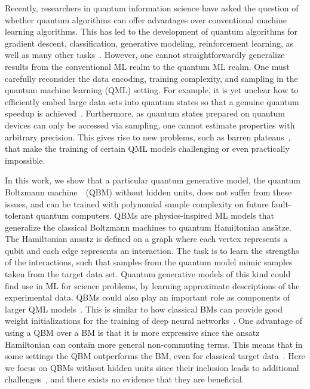 \documentclass[
    aps,
    prx,
    onecolumn
]{revtex4-2}
\begin{document}
Recently, researchers in quantum information science have asked the question of whether quantum algorithms can offer advantages over conventional machine learning algorithms. This has led to the development of quantum algorithms for gradient descent, classification, generative modeling, reinforcement learning, as well as many other tasks~\cite{Dunjko_2018, Ciliberto_2018, Benedetti_2019, Lamata_2020, Cerezo_2022}. However, one cannot straightforwardly generalize results from the conventional ML realm to the quantum ML realm. One must carefully reconsider the data encoding, training complexity, and sampling in the quantum machine learning (QML) setting. For example, it is yet unclear how to efficiently embed large data sets into quantum states so that a genuine quantum speedup is achieved~\cite{Aaronson_2015, Hoefler_2023}. Furthermore, as quantum states prepared on quantum devices can only be accessed via sampling, one cannot estimate properties with arbitrary precision. This gives rise to new problems, such as barren plateaus~\cite{McClean_2018, Grant2019initialization, Cerezo_2021, Marrero_2021, CerveroMartin2023, rudolph2023trainability}, that make the training of certain QML models challenging or even practically impossible.

In this work, we show that a particular quantum generative model, the quantum Boltzmann machine~\cite{Amin_2018, Benedetti_2017, Kieferova_2017, Kappen_2020}~(QBM) without hidden units, does not suffer from these issues, and can be trained with polynomial sample complexity on future fault-tolerant quantum computers. QBMs are physics-inspired ML models that generalize the classical Boltzmann machines to quantum Hamiltonian ans{\"a}tze. The Hamiltonian ansatz is defined on a graph where each vertex represents a qubit and each edge represents an interaction. The task is to learn the strengths of the interactions, such that samples from the quantum model mimic samples taken from the target data set. Quantum generative models of this kind could find use in ML for science problems, by learning approximate descriptions of the experimental data. QBMs could also play an important role as components of larger QML models~\cite{Benedetti_2018, Khoshaman_2019, Crawford_2019, Wilson_2021, Wang_2021}. This is similar to how classical BMs can provide good weight initializations for the training of deep neural networks~\cite{Hinton_2006}. One advantage of using a QBM over a BM is that it is more expressive since the ansatz Hamiltonian can contain more general non-commuting terms. This means that in some settings the QBM outperforms the BM, even for classical target data~\cite{Kappen_2020}. Here we focus on QBMs without hidden units since their inclusion leads to additional challenges~\cite{Wiebe_2019, Kieferova_2021, Marrero_2021}, and there exists no evidence that they are beneficial.
\end{document}
